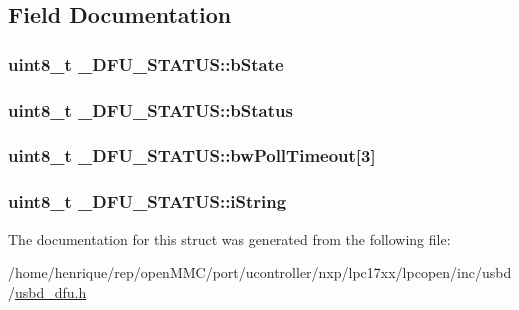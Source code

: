 \subsection{Field Documentation}
\hypertarget{struct__DFU__STATUS_a0beec369f74d37d0e6329e3826e7b1ef}{
\subsubsection[{b\-State}]{\setlength{\rightskip}{0pt plus 5cm}uint8\-\_\-t \-\_\-\-D\-F\-U\-\_\-\-S\-T\-A\-T\-U\-S\-::b\-State}}\label{struct__DFU__STATUS_a0beec369f74d37d0e6329e3826e7b1ef}
\hypertarget{struct__DFU__STATUS_a119f8cd204d5cac52dc10c5a05847c11}{
\subsubsection[{b\-Status}]{\setlength{\rightskip}{0pt plus 5cm}uint8\-\_\-t \-\_\-\-D\-F\-U\-\_\-\-S\-T\-A\-T\-U\-S\-::b\-Status}}\label{struct__DFU__STATUS_a119f8cd204d5cac52dc10c5a05847c11}
\hypertarget{struct__DFU__STATUS_acb250abf9daba1a07c7ec98cb0e89bfe}{
\subsubsection[{bw\-Poll\-Timeout}]{\setlength{\rightskip}{0pt plus 5cm}uint8\-\_\-t \-\_\-\-D\-F\-U\-\_\-\-S\-T\-A\-T\-U\-S\-::bw\-Poll\-Timeout\mbox{[}3\mbox{]}}}\label{struct__DFU__STATUS_acb250abf9daba1a07c7ec98cb0e89bfe}
\hypertarget{struct__DFU__STATUS_ab486ff4ce617b2808ec80d0188403aab}{
\subsubsection[{i\-String}]{\setlength{\rightskip}{0pt plus 5cm}uint8\-\_\-t \-\_\-\-D\-F\-U\-\_\-\-S\-T\-A\-T\-U\-S\-::i\-String}}\label{struct__DFU__STATUS_ab486ff4ce617b2808ec80d0188403aab}


The documentation for this struct was generated from the following file\-:\begin{DoxyCompactItemize}
\item 
/home/henrique/rep/open\-M\-M\-C/port/ucontroller/nxp/lpc17xx/lpcopen/inc/usbd/\hyperlink{usbd__dfu_8h}{usbd\-\_\-dfu.\-h}\end{DoxyCompactItemize}
